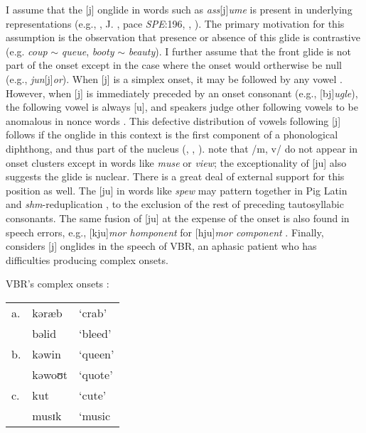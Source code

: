I assume that the [j] onglide in words such as \emph{ass}[j]\emph{ume} is present in underlying representations (e.g., \citealt[][278]{Borowsky1986}, J. \citealt{Anderson1988b}, pace \emph{SPE}:196, \citealt[][89]{Halle1985a}, \citealt[][217]{McMahon1990}). The primary motivation for this assumption is the observation that presence or absence of this glide is contrastive (e.g. \emph{coup} $\sim$ \emph{queue}, \emph{booty} $\sim$ \emph{beauty}). I further assume that the front glide is not part of the onset except in the case where the onset would ortherwise be null (e.g., \emph{jun}[j]\emph{or}).
When [j] is a simplex onset, it may be followed by any vowel \citep[][276]{Borowsky1986}. However, when [j] is immediately preceded by an onset consonant (e.g., [bj]\emph{ugle}), the following vowel is always [u\lm], and speakers judge other following vowels to be anomalous in nonce words \citep{Moreland2009}. This defective distribution of vowels following [j] follows if the onglide in this context is the first component of a phonological diphthong, and thus part of the nucleus (\citealp[][232]{Hayes1980}, \citealp[][61f.]{Harris1994}, \citealp{Davis1995}). \citet[][42]{Clements1983} note that /m, v/ do not appear in onset clusters except in words like \emph{muse} or \emph{view}; the exceptionality of [ju\lm] also suggests the glide is nuclear. There is a great deal of external support for this position as well. The [ju\lm] in words like \emph{spew} may pattern together in Pig Latin \citep{Davis1995,Idsardi2005} and \emph{shm}-reduplication \citep{Nevins2003}, to the exclusion of the rest of preceding tautosyllabic consonants. The same fusion of [ju\lm] at the expense of the onset is also found in speech errors, e.g., [kju\lm]\emph{mor homponent} for [hju\lm]\emph{mor component} \citep[][130]{Shattuck-Hufnagel1986}. Finally, \citet{Buchwald2005} considers [j] onglides in the speech of VBR, an aphasic patient who has difficulties producing complex onsets. 

\ex VBR's complex onsets \citep[79--80, his transcriptions]{Buchwald2005}: \\
\begin{tabular}{l l l}
a. & kəræb  & `crab'  \\
   & bəlid  & `bleed' \\
b. & kəwin  & `queen' \\
   & kəwoʊt & `quote' \\
c. & kut    & `cute'  \\
   & musɪk  & `music  \\ 
\end{tabular}
\xe

